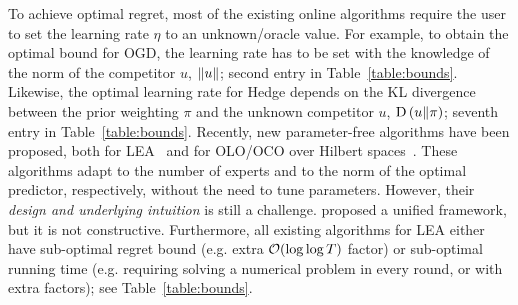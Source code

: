 To achieve optimal regret, most of the existing online algorithms require the user to
set the learning rate $\eta$ to an unknown/oracle value.  For example, to obtain the
optimal bound for \ac{OGD}, the learning rate has to be set with the knowledge
of the norm of the competitor $u$, $\left\|{u}\right\|$; second entry in Table~\ref{table:bounds}.
Likewise, the optimal learning rate for Hedge depends on the KL divergence
between the prior weighting $\pi$ and the unknown competitor $u$, $\operatorname{D}\left({u}\middle\|{\pi}\right)$; seventh entry
in Table~\ref{table:bounds}.  Recently, new parameter-free
algorithms have been proposed, both for
\ac{LEA}~\cite{Chaudhuri-Freund-Hsu-2009, Chernov-Vovk-2010, Luo-Schapire-2014,
Luo-Schapire-2015, Koolen-van-Erven-2015, Foster-Rakhlin-Sridharan-2015} and
for \ac{OLO}/\ac{OCO} over Hilbert spaces~\cite{Streeter-McMahan-2012,
Orabona-2013, McMahan-Abernethy-2013, McMahan-Orabona-2014, Orabona-2014}.
These algorithms adapt to the number of experts and to the norm of the optimal
predictor, respectively, without the need to tune parameters. However, their
\emph{design and underlying intuition} is still a challenge.
\citet{Foster-Rakhlin-Sridharan-2015} proposed a unified framework, but it is not constructive.
Furthermore, all
existing algorithms for LEA either have sub-optimal regret bound (e.g. extra
$\mathcal{O}(\log \log T)$ factor) or sub-optimal running time (e.g.  requiring
solving a numerical problem in every round, or with extra factors); see
Table~\ref{table:bounds}.

